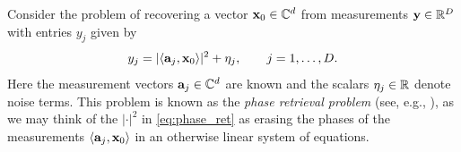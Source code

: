 




Consider the problem of recovering a vector $\mathbf x_0 \in \mathbb{C}^d$ from measurements $\mathbf y \in \mathbb{R}^D$ with entries $y_j$ given by
\begin{equation}
y_j = |\langle \mathbf{a}_j, \mathbf x_0 \rangle|^2 + \eta_j, \quad\quad j = 1,\ldots, D.\label{eq:phase_ret}
\end{equation}
Here the measurement vectors $\mathbf{a}_j\in \mathbb{C}^d$ are known and the scalars $\eta_j \in \mathbb{R}$ denote noise terms.  This problem is known as the \emph{phase retrieval problem} (see, e.g., \cite{walther1963question, millane1990phase}), as we may think of the $|\cdot|^2$ in \eqref{eq:phase_ret} as erasing the phases of the measurements $\langle \mathbf a_j, \mathbf x_0 \rangle$ in an otherwise linear system of equations.

